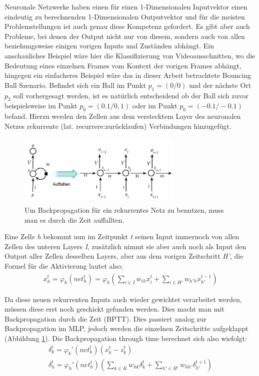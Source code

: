 Neuronale Netzwerke haben einen für einen 1-Dimensionalen Inputvektor einen eindeutig zu berechnenden 1-Dimensionalen Outputvektor und für die meisten Problemstellungen ist auch genau diese Kompetenz gefordert. Es gibt aber auch Probleme, bei denen der Output nicht nur von diesem, sondern auch von allen beziehungsweise einigen vorigen Inputs und Zuständen abhängt. Ein anschauliches Beispiel wäre hier die Klassifizierung von Videoausschnitten, wo die Bedeutung eines einzelnen Frames vom Kontext der vorigen Frames abhängt, hingegen ein einfacheres Beispiel wäre das in dieser Arbeit betrachtete Bouncing Ball Szenario. Befindet sich ein Ball im Punkt \(p_{1}=(0/0)\) und der nächste Ort \(p_{2}\) soll vorhergesagt werden, ist es natürlich entscheidend ob der Ball sich zuvor beispielsweise im Punkt \(p_{0}=(0.1/0,1)\) oder im Punkt \(p_{0}=(-0.1/-0.1)\) befand. Hierzu werden den Zellen aus dem verstecktem Layer des neuronalen Netzes rekurrente (lat. recurrere:zurücklaufen) Verbindungen hinzugefügt.
\begin{figure}
	\centering
	\includegraphics[width=0.7\textwidth, height=130px]{pics/rnn.jpg}	
	\caption{Um Backpropagation für ein rekurrentes Netz zu benutzen, muss man es durch die Zeit auffallten. \cite{bib:rnn}}
	\label{img:rnn}
\end{figure}
Eine Zelle \textit{h} bekommt nun im Zeitpunkt \textit{t} seinen Input immernoch von allen Zellen des unteren Layers \textit{I}, zusätzlich nimmt sie aber auch noch als Input den Output aller Zellen desselben Layers, aber aus dem vorigen Zeitschritt \textit{H'}, die Formel für die Aktivierung lautet also: 
\begin{gather}
x^{t}_{h}=\varphi_{h}(net_{h}^{t})=\varphi_{h}(\sum_{i \in I}w_{ih}x^{t}_{i}+\sum_{i \in H'}w_{h'h}x^{t-1}_{h'})
\end{gather}

Da diese neuen rekurrenten Inputs auch wieder gewichtet verarbeitet werden, müssen diese erst noch geschickt gefunden werden. Dies macht man mit Backpropagation durch die Zeit (BPTT). Dies passiert analog zur Backpropagation im MLP, jedoch werden die einzelnen Zeitschritte aufgeklappt (Abbildung \ref{img:rnn}). Die Backpropagation through time berechnet sich also wiefolgt:
\begin{gather}
	\delta_{k}^{t} = \varphi_{k}'(net_{k}^{t})(x_{k}^{t}-z^{t}_{k}) \\
	\delta_{h}^{t} = \varphi_{h}'(net_{h}^{t})(\sum_{k \in K}w_{hk}\delta^{t}_{k}+\sum_{h' \in H'}w_{hh'}\delta^{t+1}_{h'})
\end{gather}

